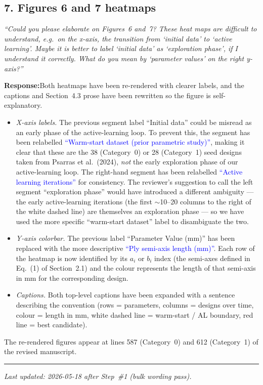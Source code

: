 \documentclass[11pt,a4paper]{article}
\newcommand{\new}[1]{\textcolor{blue}{#1}}
\newcommand{\rev}[1]{\par\noindent\textit{\small #1}\par\smallskip}
\newcommand{\resp}{\par\noindent\textbf{Response:}\space}
\begin{document}
\subsection*{7. Figures 6 and 7 heatmaps}
\rev{``Could you please elaborate on Figures~6 and~7? These heat maps are difficult to understand, e.g.\ on the x-axis, the transition from `initial data' to `active learning'. Maybe it is better to label `initial data' as `exploration phase', if I understand it correctly. What do you mean by `parameter values' on the right y-axis?''}
\resp Both heatmaps have been re-rendered with clearer labels, and the captions and Section~4.3 prose have been rewritten so the figure is self-explanatory.
\begin{itemize}
    \item \emph{X-axis labels.} The previous segment label ``Initial data'' could be misread as an early phase of the active-learning loop. To prevent this, the segment has been relabelled \new{``Warm-start dataset (prior parametric study)''}, making it clear that these are the 38 (Category~0) or 28 (Category~1) seed designs taken from Psarras et al.\ (2024), \emph{not} the early exploration phase of our active-learning loop. The right-hand segment has been relabelled \new{``Active learning iterations''} for consistency. The reviewer's suggestion to call the left segment ``exploration phase'' would have introduced a different ambiguity --- the early active-learning iterations (the first $\sim$10--20 columns to the right of the white dashed line) are themselves an exploration phase --- so we have used the more specific ``warm-start dataset'' label to disambiguate the two.
    \item \emph{Y-axis colorbar.} The previous label ``Parameter Value (mm)'' has been replaced with the more descriptive \new{``Ply semi-axis length (mm)''}. Each row of the heatmap is now identified by its $a_i$ or $b_i$ index (the semi-axes defined in Eq.~(1) of Section~2.1) and the colour represents the length of that semi-axis in mm for the corresponding design.
    \item \emph{Captions.} Both top-level captions have been expanded with a sentence describing the convention (rows = parameters, columns = designs over time, colour = length in mm, white dashed line = warm-start / AL boundary, red line = best candidate).
\end{itemize}
The re-rendered figures appear at lines 587 (Category~0) and 612 (Category~1) of the revised manuscript.

\medskip
\hrule
\medskip

\noindent\textit{Last updated: 2026-05-18 after Step~\#1 (bulk wording pass).}
\end{document}
